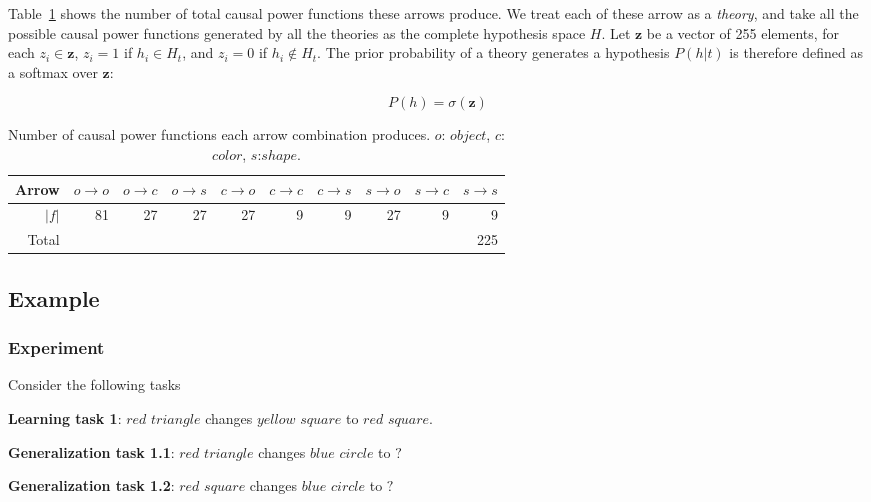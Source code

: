 \documentclass{article}
\begin{document}
Table~\ref{functions} shows the number of total causal power functions these arrows produce. We treat each of these arrow as a \emph{theory}, and take all the possible causal power functions generated by all the theories as the complete hypothesis space $H$. Let $\mathbf{z}$ be a vector of 255 elements, for each $z_i \in \mathbf{z}$, $z_i = 1$ if $h_i \in H_t$, and $z_i = 0$ if $h_i \not \in H_t$. The prior probability of a theory generates a hypothesis $P(h|t)$ is therefore defined as a softmax over $\mathbf{z}$:

\begin{equation}
	P(h) = \sigma(\mathbf{z})
\end{equation}



\begin{table}[]
	\centering
	\begin{tabular}{rrrrrrrrrr}
		Arrow & $o \rightarrow o$ & $o \rightarrow c$ & $o \rightarrow s$ & $c \rightarrow o$ & $c \rightarrow c$ & $c \rightarrow s$ & $s \rightarrow o$ & $s \rightarrow c$ & $s \rightarrow s$ \\
		\hline \hline
		$|f|$ & 81  & 27  & 27  & 27  & 9   & 9   & 27  & 9   & 9   \\
		\hline
		Total &     &     &     &     &     &     &     &     & 225
	\end{tabular}
	\caption{Number of causal power functions each arrow combination produces. $o$: $object$, $c$: $color$, $s$:$shape$.}
	\label{functions}
\end{table}

\subsection*{Example}

\subsubsection*{Experiment}

Consider the following tasks

\textbf{Learning task 1}: $red$ $triangle$ changes $yellow$ $square$ to $red$ $square$.

\textbf{Generalization task 1.1}: $red$ $triangle$ changes $blue$ $circle$ to $?$

\textbf{Generalization task 1.2}: $red$ $square$ changes $blue$ $circle$ to $?$

\vspace*{1em}
\end{document}
